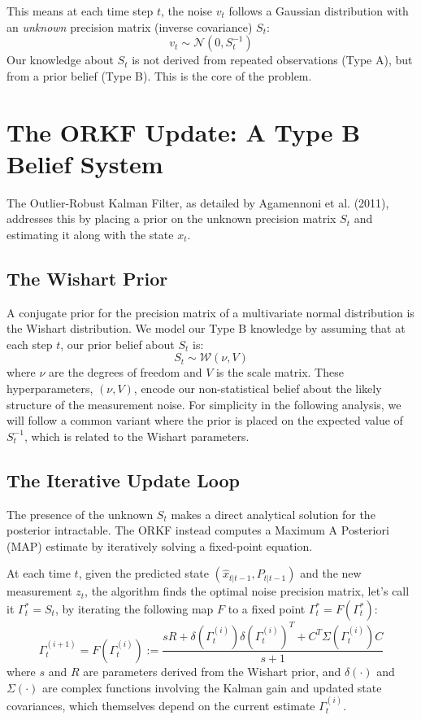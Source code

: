 \documentclass[12pt]{article}
\theoremstyle{definition}
\theoremstyle{plain}
\begin{document}
This means at each time step $t$, the noise $v_t$ follows a Gaussian distribution with an \emph{unknown} precision matrix (inverse covariance) $S_t$:
\[
v_t \sim \mathcal{N}(0, S_t^{-1})
\]
Our knowledge about $S_t$ is not derived from repeated observations (Type A), but from a prior belief (Type B). This is the core of the problem.

\section{The ORKF Update: A Type B Belief System}
The Outlier-Robust Kalman Filter, as detailed by Agamennoni et al. (2011), addresses this by placing a prior on the unknown precision matrix $S_t$ and estimating it along with the state $x_t$.

\subsection{The Wishart Prior}
A conjugate prior for the precision matrix of a multivariate normal distribution is the Wishart distribution. We model our Type B knowledge by assuming that at each step $t$, our prior belief about $S_t$ is:
\[
S_t \sim \mathcal{W}(\nu, V)
\]
where $\nu$ are the degrees of freedom and $V$ is the scale matrix. These hyperparameters, $(\nu, V)$, encode our non-statistical belief about the likely structure of the measurement noise. For simplicity in the following analysis, we will follow a common variant where the prior is placed on the expected value of $S_t^{-1}$, which is related to the Wishart parameters.

\subsection{The Iterative Update Loop}
The presence of the unknown $S_t$ makes a direct analytical solution for the posterior intractable. The ORKF instead computes a Maximum A Posteriori (MAP) estimate by iteratively solving a fixed-point equation.

At each time $t$, given the predicted state $(\hat{x}_{t|t-1}, P_{t|t-1})$ and the new measurement $z_t$, the algorithm finds the optimal noise precision matrix, let's call it $\Gamma_t^* = S_t$, by iterating the following map $F$ to a fixed point $\Gamma_t^* = F(\Gamma_t^*)$:
\begin{equation}\label{eq:orkf_update}
\Gamma^{(i+1)}_t = F(\Gamma^{(i)}_t) := \frac{s R + \delta(\Gamma^{(i)}_t)\delta(\Gamma^{(i)}_t)^{T} + C^{T}\Sigma(\Gamma^{(i)}_t)C}{s+1}
\end{equation}
where $s$ and $R$ are parameters derived from the Wishart prior, and $\delta(\cdot)$ and $\Sigma(\cdot)$ are complex functions involving the Kalman gain and updated state covariances, which themselves depend on the current estimate $\Gamma^{(i)}_t$.
\end{document}

